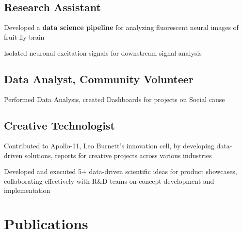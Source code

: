\documentclass[letterpaper]{deedy-resume} %
\begin{document}
\begin{minipage}[t]{0.62\textwidth}
\subsection{Research Assistant}
\hfill {}
\vspace{-0.2\topsep}
\begin{tightitemize}
    \item Developed a {\bf data science pipeline} for analyzing fluorescent neural images of fruit-fly brain
    \item Isolated neuronal excitation signals for downstream signal analysis 
\end{tightitemize}



\sectionspace
\subsection{Data Analyst, Community Volunteer}
\hfill {}
\vspace{-0.2\topsep}
\begin{tightitemize}
    \item Performed Data Analysis, created Dashboards for projects on Social cause
\end{tightitemize}


\sectionspace %
\subsection{Creative Technologist}
\hfill {}
\vspace{-0.2\topsep}
\begin{tightitemize}
    \item Contributed to Apollo-11, Leo Burnett's innovation cell, by developing data-driven solutions, reports for creative projects across various industries
    \item Developed and executed 5+ data-driven scientific ideas for product showcases, collaborating effectively with R\&D teams on concept development and implementation
\end{tightitemize}


\section{Publications}


\end{minipage}
\end{document}
